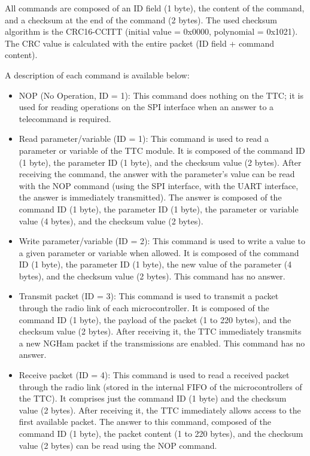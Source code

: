 All commands are composed of an ID field (1 byte), the content of the command, and a checksum at the end of the command (2 bytes). The used checksum algorithm is the CRC16-CCITT  (initial value = 0x0000, polynomial = 0x1021). The CRC value is calculated with the entire packet (ID field + command content).

A description of each command is available below:

\begin{itemize}
    \item NOP (No Operation, ID = 1): This command does nothing on the TTC; it is used for reading operations on the SPI interface when an answer to a telecommand is required.
    \item Read parameter/variable (ID = 1): This command is used to read a parameter or variable of the TTC module. It is composed of the command ID (1 byte), the parameter ID (1 byte), and the checksum value (2 bytes). After receiving the command, the answer with the parameter's value can be read with the NOP command (using the SPI interface, with the UART interface, the answer is immediately transmitted). The answer is composed of the command ID (1 byte), the parameter ID (1 byte), the parameter or variable value (4 bytes), and the checksum value (2 bytes).
    \item Write parameter/variable (ID = 2): This command is used to write a value to a given parameter or variable when allowed. It is composed of the command ID (1 byte), the parameter ID (1 byte), the new value of the parameter (4 bytes), and the checksum value (2 bytes). This command has no answer.
    \item Transmit packet (ID = 3): This command is used to transmit a packet through the radio link of each microcontroller. It is composed of the command ID (1 byte), the payload of the packet (1 to 220 bytes), and the checksum value (2 bytes). After receiving it, the TTC immediately transmits a new NGHam packet if the transmissions are enabled. This command has no answer.
    \item Receive packet (ID = 4): This command is used to read a received packet through the radio link (stored in the internal FIFO of the microcontrollers of the TTC). It comprises just the command ID (1 byte) and the checksum value (2 bytes). After receiving it, the TTC immediately allows access to the first available packet. The answer to this command, composed of the command ID (1 byte), the packet content (1 to 220 bytes), and the checksum value (2 bytes) can be read using the NOP command.
\end{itemize}


